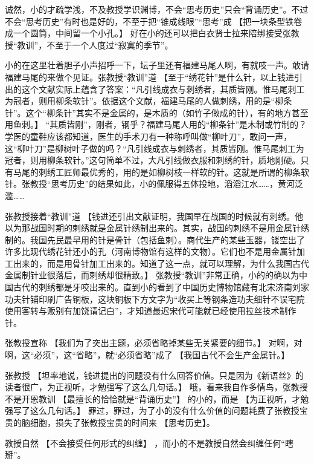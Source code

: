 诚然，小的才疏学浅，不及教授学识渊博，不会“思考历史”只会“背诵历史”。不过不会“思考历史”有时也是好的，不至于把“锥成线眼”“思考”成
\fangsong
【把一块条型铁卷成一个圆筒，中间留一个小孔。】
\normalfont
好在小的还可以把白衣贤士拉来陪绑接受张教授“教训”，不至于一个人度过“寂寞的季节”。

小的在这里壮着胆子小声招呼一下，坛子里还有福建马尾人啊，有就吱一声。敢请福建马尾的来做个见证。张教授“教训”道
\fangsong
【至于“绣花针”是什么针，以上钱进引出的这个文献实际上蕴含了答案：“凡引线成衣与刺绣者，其质皆刚。惟马尾刺工为冠者，则用柳条软针”。依据这个文献，福建马尾的人做刺绣，用的是“柳条针”。这个“柳条针”其实不是金属的，是木质的（如竹子做成的针），有的地方甚至用鱼刺。】
\normalfont
“其质皆刚”，刚者，钢乎？福建马尾人用的“柳条针”是木制或竹制的？学医的童鞋应该都知道，医生的手术刀有一种称呼叫做“柳叶刀”，敢问一声，这“柳叶刀”是柳树叶子做的吗？“凡引线成衣与刺绣者，其质皆刚。惟马尾刺工为冠者，则用柳条软针。”这句简单不过，大凡引线做衣服和刺绣的针，质地刚硬。只有马尾的刺绣工匠师最优秀的，用的是如柳树枝一样软的针。这就是所谓的柳条软针。张教授“思考历史”的结果如此，小的佩服得五体投地，滔滔江水……，黄河泛滥……

张教授接着“教训”道
\fangsong
【钱进还引出文献证明，我国早在战国的时候就有刺绣。他以为那战国时期的刺绣就是金属针绣制出来的。其实，战国的刺绣不是用金属针绣制的。我国先民最早用的针是骨针（包括鱼刺）。商代生产的某些玉器，镂空出了许多比现代绣花针还小的孔（河南博物馆有这样的文物）。它们也不是用金属针加工出来的，而是用骨针加工出来的。知道了这一点，就可以理解，为什么我国古代金属制针业很落后，而刺绣却很精致。】
\normalfont
张教授“教训”非常正确，小的的确以为中国古代的刺绣都是牙咬出来的。直到小的看到了中国历史博物馆藏有北宋济南刘家功夫针铺印刷广告铜板，这块铜板下方文字为“收买上等钢条造功夫细针不误宅院使用客转与贩别有加饶请记白”，才知道最迟宋代可能就已经使用拉丝技术制作针。

张教授宣称
\fangsong
【我们为了突出主题，必须省略掉某些无关紧要的细节。】
\normalfont
对啊，对啊，这“必须”，这“省略”，就“必须省略”成了
\fangsong
【我国古代不会生产金属针。】

\normalfont
张教授
\fangsong
【坦率地说，钱进提出的问题没有什么回答价值。只是因为《新语丝》的读者很广，为正视听，才勉强写了这么几句话。】
\normalfont
哦，看来我自作多情鸟，张教授不是开恩教训
\fangsong
【最擅长的恰恰就是“背诵历史”】
\normalfont
的小的，而是
\fangsong
【为正视听，才勉强写了这么几句话。】
\normalfont
罪过，罪过，为了小的没有什么价值的问题耗费了张教授宝贵的脑细胞，损失了张教授宝贵的时间来
\fangsong
【思考历史】。

\normalfont
教授自然
\fangsong
【不会接受任何形式的纠缠】
\normalfont
，而小的不是教授自然会纠缠任何“瞎掰”。